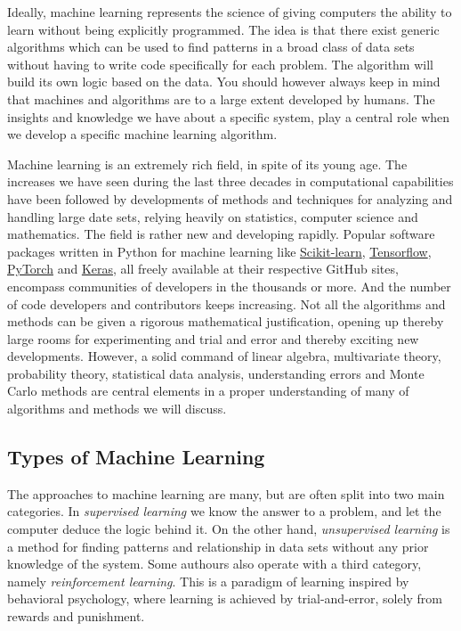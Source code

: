 \documentclass[%
oneside,                 %
final,                   %
10pt]{article}
\begin{document}
Ideally, machine learning represents the science of giving computers
the ability to learn without being explicitly programmed.  The idea is
that there exist generic algorithms which can be used to find patterns
in a broad class of data sets without having to write code
specifically for each problem. The algorithm will build its own logic
based on the data.  You should however always keep in mind that
machines and algorithms are to a large extent developed by humans. The
insights and knowledge we have about a specific system, play a central
role when we develop a specific machine learning algorithm. 

Machine learning is an extremely rich field, in spite of its young
age. The increases we have seen during the last three decades in
computational capabilities have been followed by developments of
methods and techniques for analyzing and handling large date sets,
relying heavily on statistics, computer science and mathematics.  The
field is rather new and developing rapidly. Popular software packages
written in Python for machine learning like
\href{{http://scikit-learn.org/stable/}}{Scikit-learn},
\href{{https://www.tensorflow.org/}}{Tensorflow},
\href{{http://pytorch.org/}}{PyTorch} and \href{{https://keras.io/}}{Keras}, all
freely available at their respective GitHub sites, encompass
communities of developers in the thousands or more. And the number of
code developers and contributors keeps increasing. Not all the
algorithms and methods can be given a rigorous mathematical
justification, opening up thereby large rooms for experimenting and
trial and error and thereby exciting new developments.  However, a
solid command of linear algebra, multivariate theory, probability
theory, statistical data analysis, understanding errors and Monte
Carlo methods are central elements in a proper understanding of many
of algorithms and methods we will discuss.



\subsection{Types of Machine Learning}


The approaches to machine learning are many, but are often split into
two main categories.  In \emph{supervised learning} we know the answer to a
problem, and let the computer deduce the logic behind it. On the other
hand, \emph{unsupervised learning} is a method for finding patterns and
relationship in data sets without any prior knowledge of the system.
Some authours also operate with a third category, namely
\emph{reinforcement learning}. This is a paradigm of learning inspired by
behavioral psychology, where learning is achieved by trial-and-error,
solely from rewards and punishment.
\end{document}
